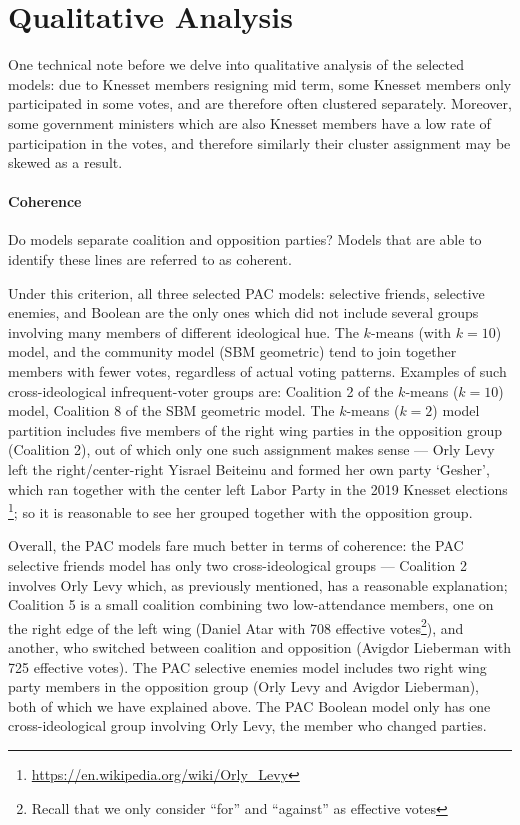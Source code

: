 \section{Qualitative Analysis}
\label{sec:qualitative_analysis}

One technical note before we delve into qualitative analysis of the selected
models: due to Knesset members resigning mid term, some Knesset members only participated in some votes, and are therefore often clustered separately.
Moreover, some government ministers which are also Knesset members have a low
rate of participation in the votes, and therefore similarly their cluster 
assignment may be skewed as a result.

\paragraph{Coherence}
Do models separate coalition and opposition parties? Models that are able to identify these lines are referred to as coherent.

Under this criterion, all three selected PAC models: selective friends,
selective enemies, and Boolean are the only ones which did not include several
groups involving many members of different ideological hue.
The $k$-means (with $k=10$) model, and the community model (SBM geometric) tend to
join together members with fewer votes, regardless of actual voting patterns.
Examples of such cross-ideological infrequent-voter groups are: Coalition 2
of the $k$-means ($k=10$) model, Coalition 8 of the SBM geometric model.
The $k$-means ($k=2$) model partition includes five members of the right wing
parties in the opposition group (Coalition 2), out of which only one such
assignment makes sense --- Orly Levy left the right/center-right Yisrael
Beiteinu and formed her own party `Gesher', which ran together with the center
left Labor Party in the 2019 Knesset elections
\footnote{\url{https://en.wikipedia.org/wiki/Orly_Levy}}; so it is reasonable to
see her grouped together with the opposition group.

Overall, the PAC models fare much better in terms of coherence:
the PAC selective friends model has only two cross-ideological groups ---
Coalition 2 involves Orly Levy which, as previously mentioned, has a reasonable
explanation; Coalition 5 is a small coalition combining two low-attendance
members, one on the right edge of the left wing (Daniel Atar with 708 effective
votes\footnote{Recall that we only consider ``for'' and ``against'' as
effective votes}), and another, who switched between coalition and opposition
(Avigdor Lieberman with 725 effective votes).
The PAC selective enemies model includes two right wing party members in the
opposition group (Orly Levy and Avigdor Lieberman), both of which we have
explained above.
The PAC Boolean model only has one cross-ideological group involving Orly Levy,
the member who changed parties.

